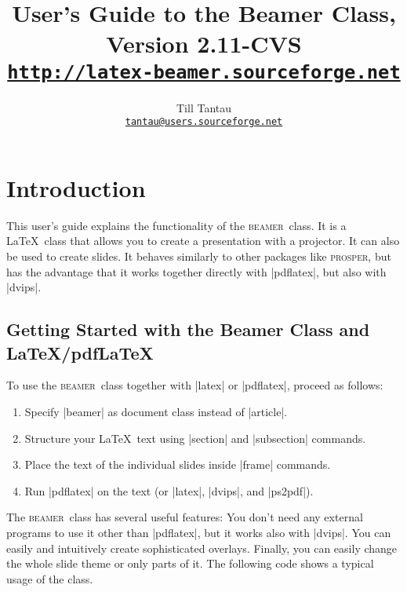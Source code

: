 \documentclass{ltxdoc}
\def\beamer{\textsc{beamer}}
\begin{document}
\title{User's Guide to the Beamer Class, Version 2.11-CVS\\
\Large\href{http://latex-beamer.sourceforge.net}{\texttt{http://latex-beamer.sourceforge.net}}}
\author{Till Tantau\\
  \href{mailto:tantau@users.sourceforge.net}{\texttt{tantau@users.sourceforge.net}}}

\maketitle

\tableofcontents

\section{Introduction}

This user's guide explains the functionality of the \beamer\ class.
It is a \LaTeX\ class that allows you to create a presentation with a
projector. It can also be used to create slides. It behaves 
similarly to other packages like \textsc{prosper}, but has the
advantage that it works together directly with |pdflatex|, but
also with |dvips|.

\subsection{Getting Started with the Beamer Class and \LaTeX/pdf\LaTeX}

To use the \beamer\ class together with |latex| or |pdflatex|, proceed
as follows: 
\begin{enumerate}
\item
  Specify |beamer| as document class instead of
  |article|.
\item
  Structure your \LaTeX\ text using |section| and
  |subsection| commands.
\item
  Place the text of the individual slides inside |frame|
  commands.
\item
  Run |pdflatex| on the text (or |latex|,
  |dvips|, and |ps2pdf|).
\end{enumerate}

The \beamer\ class has several useful features: You don't need any
external programs to use it other than |pdflatex|, but it works
also with |dvips|. You can easily and intuitively create
sophisticated overlays. Finally, you can easily change the whole slide
theme or only parts of it. The following code shows a typical usage of
the class.
\end{document}
